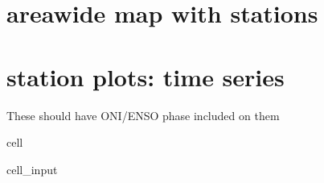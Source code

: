 \documentclass[letterpaper,10pt,english]{jupyterBook}
\begin{document}
\chapter{area\sphinxhyphen{}wide map with stations}
\label{\detokenize{notebooks/regional_and_local/SL_anomaly_annual:area-wide-map-with-stations}}

\chapter{station plots: time series}
\label{\detokenize{notebooks/regional_and_local/SL_anomaly_annual:station-plots-time-series}}
\sphinxAtStartPar
These should have ONI/ENSO phase included on them

\begin{sphinxuseclass}{cell}\begin{sphinxVerbatimInput}

\begin{sphinxuseclass}{cell_input}
\begin{sphinxVerbatim}[commandchars=\\\{\}]
       

     
     


\end{sphinxVerbatim}
\end{sphinxuseclass}
\end{sphinxVerbatimInput}
\end{sphinxuseclass}
\end{document}
